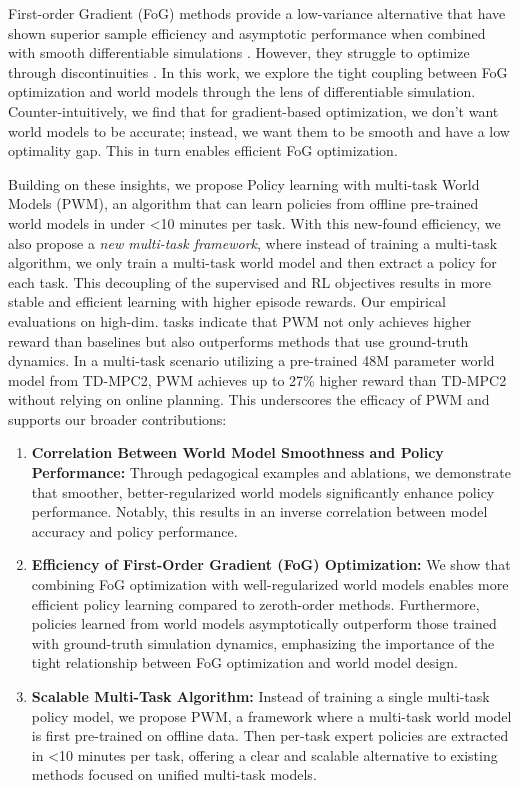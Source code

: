 \documentclass{article} %
\begin{document}
First-order Gradient (FoG) methods provide a low-variance alternative that have shown superior sample efficiency and asymptotic performance when combined with smooth differentiable simulations \citet{xu2022accelerated}. However, they struggle to optimize through discontinuities \citet{suh2022differentiable,georgiev2024adaptive}. In this work, we explore the tight coupling between FoG optimization and world models through the lens of differentiable simulation. Counter-intuitively, we find that for gradient-based optimization, we don't want world models to be accurate; instead, we want them to be smooth and have a low optimality gap. This in turn enables efficient FoG optimization.

Building on these insights, we propose Policy learning with multi-task World Models (PWM), an algorithm that can learn policies from offline pre-trained world models in under <10 minutes per task. With this new-found efficiency, we also propose a \textit{new multi-task framework}, where instead of training a multi-task algorithm, we only train a multi-task world model and then extract a policy for each task. This decoupling of the supervised and RL objectives results in more stable and efficient learning with higher episode rewards. Our empirical evaluations on high-dim. tasks indicate that PWM not only achieves higher reward than baselines but also outperforms methods that use ground-truth dynamics. In a multi-task scenario utilizing a pre-trained 48M parameter world model from TD-MPC2, PWM achieves up to 27\% higher reward than TD-MPC2 without relying on online planning. This underscores the efficacy of PWM and supports our broader contributions:

\begin{enumerate}
    \item \textbf{Correlation Between World Model Smoothness and Policy Performance:} Through pedagogical examples and ablations, we demonstrate that smoother, better-regularized world models significantly enhance policy performance. Notably, this results in an inverse correlation between model accuracy and policy performance.
    \item \textbf{Efficiency of First-Order Gradient (FoG) Optimization:} We show that combining FoG optimization with well-regularized world models enables more efficient policy learning compared to zeroth-order methods. Furthermore, policies learned from world models asymptotically outperform those trained with ground-truth simulation dynamics, emphasizing the importance of the tight relationship between FoG optimization and world model design.
    \item \textbf{Scalable Multi-Task Algorithm:} Instead of training a single multi-task policy model, we propose PWM, a framework where a multi-task world model is first pre-trained on offline data. Then per-task expert policies are extracted in <10 minutes per task, offering a clear and scalable alternative to existing methods focused on unified multi-task models.
\end{enumerate}
\end{document}
